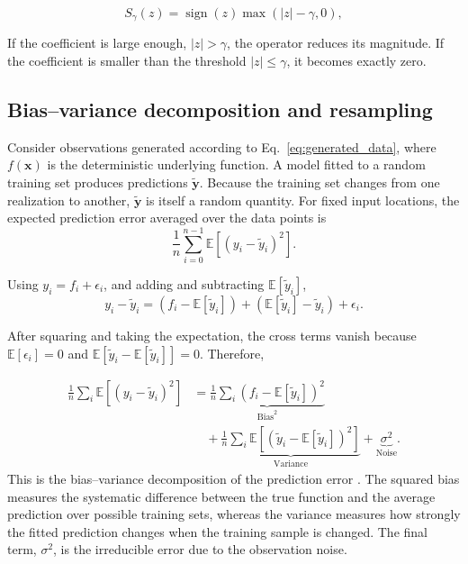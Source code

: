 \documentclass[aps,rmp,reprint,amsmath,amssymb,graphicx,longbibliography]{revtex4-1}
\begin{document}
\begin{equation}
    S_{\gamma}(z)
    =
    \operatorname{sign}(z)
    \max(|z|-\gamma,0),
    \label{eq:thresholding}
\end{equation}

If the coefficient is large enough, $|z|>\gamma$, the operator reduces its magnitude. If the coefficient is smaller than the threshold $|z|\leq \gamma$, it becomes exactly zero.

\subsection{Bias--variance decomposition and resampling}

Consider observations generated according to Eq.~\ref{eq:generated_data},
where $f(\mathbf{x})$ is the deterministic underlying function. A model fitted to
a random training set produces predictions $\mathbf{\tilde{y}}$.
Because the training set changes from one realization to another,
$\mathbf{\tilde{y}}$ is itself a random quantity. For fixed input locations, the expected prediction error averaged over the
data points is
\begin{equation}
    \frac{1}{n}
    \sum_{i=0}^{n-1}
    \mathbb{E}
    \left[
        (y_i-\tilde{y}_i)^2
    \right].
\end{equation}

Using $y_i=f_i+\epsilon_i$, and adding and subtracting
$\mathbb{E}[\tilde{y}_i]$,
\begin{equation}
    y_i-\tilde{y}_i
    =
    \left(f_i-\mathbb{E}[\tilde{y}_i]\right)
    +
    \left(\mathbb{E}[\tilde{y}_i]-\tilde{y}_i\right)
    +
    \epsilon_i .
\end{equation}

After squaring and taking the expectation, the cross terms vanish because
$\mathbb{E}[\epsilon_i]=0$ and
$\mathbb{E}[\tilde{y}_i-\mathbb{E}[\tilde{y}_i]]=0$. Therefore,

\begin{equation}
\begin{split}
    \frac{1}{n}
    \sum_i
    \mathbb{E}
    \left[
        (y_i-\tilde{y}_i)^2
    \right]
    &=
    \underbrace{
        \frac{1}{n}\sum_i
        \left(
            f_i-\mathbb{E}[\tilde{y}_i]
        \right)^2
    }_{\mathrm{Bias}^2}
    \\
    &\quad+
    \underbrace{
        \frac{1}{n}\sum_i
        \mathbb{E}
        \left[
            \left(
                \tilde{y}_i-\mathbb{E}[\tilde{y}_i]
            \right)^2
        \right]
    }_{\mathrm{Variance}}
    +
    \underbrace{\sigma^2}_{\mathrm{Noise}} .
\end{split}
\label{eq:bias_variance}
\end{equation}
This is the bias--variance decomposition of the prediction error
\cite{HjorthJensen2026MLPSCh2}. The squared bias measures the systematic
difference between the true function and the average prediction over possible
training sets, whereas the variance measures how strongly the fitted prediction
changes when the training sample is changed. The final term, $\sigma^2$, is the
irreducible error due to the observation noise.
\end{document}
